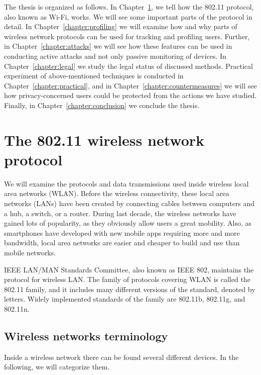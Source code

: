 \documentclass[12pt,a4paper,oneside,pdftex]{report}
\begin{document}
The thesis is organized as follows. In Chapter~\ref{chapter:protocol}, we tell how the 802.11 protocol, also known as Wi-Fi, works. We will see some important parts of the protocol in detail. In Chapter~\ref{chapter:profiling} we will examine how and why parts of wireless network protocols can be used for tracking and profiling users. Further, in Chapter~\ref{chapter:attacks} we will see how these features can be used in conducting active attacks and not only passive monitoring of devices.  In Chapter~\ref{chapter:legal} we study the legal status of discussed methods. Practical experiment of above-mentioned techniques is conducted in Chapter~\ref{chapter:practical}, and in Chapter~\ref{chapter:countermeasures} we will see how privacy-concerned users could be protected from the actions we have studied. Finally, in Chapter~\ref{chapter:conclusion} we conclude the thesis.




\chapter{The 802.11 wireless network protocol}
\label{chapter:protocol}

We will examine the protocols and data transmissions used inside wireless local area networks (WLAN). Before the wireless connectivity, these local area networks (LANs) have been created by connecting cables between computers and a hub, a switch, or a router. During last decade, the wireless networks have gained lots of popularity, as they obviously allow users a great mobility. Also, as smartphones have developed with new mobile apps requiring more and more bandwidth, local area networks are easier and cheaper to build and use than mobile networks.

IEEE LAN/MAN Standards Committee, also known as IEEE 802, maintains the protocol for wireless LAN. The family of protocols covering WLAN is called the 802.11 family, and it includes many different versions of the standard, denoted by letters. Widely implemented standards of the family are 802.11b, 802.11g, and 802.11n.~\cite{IEEE802.11}


\section{Wireless networks terminology}
\label{sec:terminology}

Inside a wireless network there can be found several different devices. In the following, we will categorize them.
\end{document}
